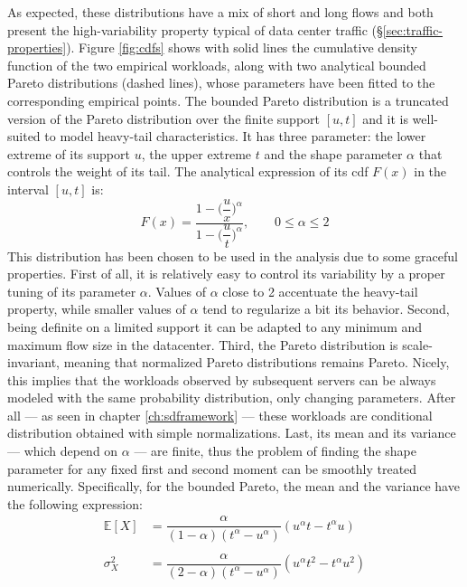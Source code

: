 As expected, these distributions have a mix of short and long flows and both present the high-variability property typical of data center traffic (\S \ref{sec:traffic-properties}). Figure \ref{fig:cdfs} shows with solid lines the cumulative density function of the two empirical workloads, along with two analytical bounded Pareto distributions (dashed lines), whose parameters have been fitted to the corresponding empirical points. The bounded Pareto distribution is a truncated version of the Pareto distribution over the finite support $[u,t]$ and it is well-suited to model heavy-tail characteristics. It has three parameter: the lower extreme of its support $u$, the upper extreme $t$ and the shape parameter $\alpha$ that controls the weight of its tail. The analytical expression of its cdf $F(x)$ in the interval $[u,t]$ is:
\begin{equation}
	\label{eq:bpcdf}
	F(x) = \dfrac{1-\Big(\dfrac{u}{x}\Big)^{\alpha}}{1-\Big(\dfrac{u}{t}\Big)^{\alpha}}, \qquad 0 \le \alpha \le 2
\end{equation}
This distribution has been chosen to be used in the analysis due to some graceful properties. First of all, it is relatively easy to control its variability by a proper tuning of its parameter $\alpha$. Values of $\alpha$ close to 2 accentuate the heavy-tail property, while smaller values of $\alpha$ tend to regularize a bit its behavior. Second, being definite on a limited support it can be adapted to any minimum and maximum flow size in the datacenter. Third, the Pareto distribution is scale-invariant, meaning that normalized Pareto distributions remains Pareto. Nicely, this implies that the workloads observed by subsequent servers can be always modeled with the same probability distribution, only changing parameters. After all --- as seen in chapter \ref{ch:sdframework} --- these workloads  are conditional distribution obtained with simple normalizations. Last, its mean and its variance  --- which depend on $\alpha$ --- are finite, thus the problem of finding the shape parameter for any fixed first and second moment can be smoothly treated numerically. Specifically, for the bounded Pareto, the mean and the variance have the following expression:
\begin{align*}
\mathbb{E}[X] &= \dfrac{\alpha}{(1-\alpha)(t^{\alpha}-u^{\alpha})} (u^{\alpha}t - t^{\alpha}u) \\ \\
\sigma_X^2 &= \dfrac{\alpha}{(2-\alpha)(t^{\alpha}-u^{\alpha})} (u^{\alpha}t^2 - t^{\alpha}u^2)
\end{align*}
